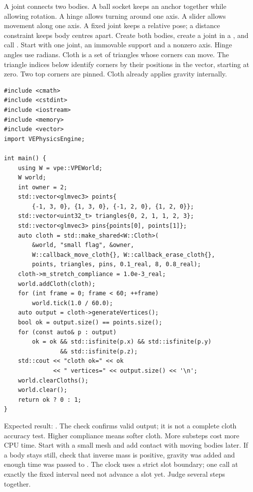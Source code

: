 \documentclass[11pt,a4paper]{article}
\begin{document}
A joint connects two bodies. A ball socket keeps an anchor together while allowing rotation. A hinge allows turning around one axis. A slider allows movement along one axis. A fixed joint keeps a relative pose; a distance constraint keeps body centres apart. Create both bodies, create a joint in a , and call . Start with one joint, an immovable support and a nonzero axis. Hinge angles use radians.
Cloth is a set of triangles whose corners can move. The triangle indices below identify corners by their positions in the vector, starting at zero. Two top corners are pinned. Cloth already applies gravity internally.%
\begin{lstlisting}
#include <cmath>
#include <cstdint>
#include <iostream>
#include <memory>
#include <vector>
import VEPhysicsEngine;

int main() {
    using W = vpe::VPEWorld;
    W world;
    int owner = 2;
    std::vector<glmvec3> points{
        {-1, 3, 0}, {1, 3, 0}, {-1, 2, 0}, {1, 2, 0}};
    std::vector<uint32_t> triangles{0, 2, 1, 1, 2, 3};
    std::vector<glmvec3> pins{points[0], points[1]};
    auto cloth = std::make_shared<W::Cloth>(
        &world, "small flag", &owner,
        W::callback_move_cloth{}, W::callback_erase_cloth{},
        points, triangles, pins, 0.1_real, 8, 0.8_real);
    cloth->m_stretch_compliance = 1.0e-3_real;
    world.addCloth(cloth);
    for (int frame = 0; frame < 60; ++frame)
        world.tick(1.0 / 60.0);
    auto output = cloth->generateVertices();
    bool ok = output.size() == points.size();
    for (const auto& p : output)
        ok = ok && std::isfinite(p.x) && std::isfinite(p.y)
                && std::isfinite(p.z);
    std::cout << "cloth ok=" << ok
              << " vertices=" << output.size() << '\n';
    world.clearCloths();
    world.clear();
    return ok ? 0 : 1;
}
\end{lstlisting}
Expected result: . The check confirms valid output; it is not a complete cloth accuracy test. Higher compliance means softer cloth. More substeps cost more CPU time. Start with a small mesh and add contact with moving bodies later.
If a body stays still, check that inverse mass is positive, gravity was added and enough time was passed to . The clock uses a strict slot boundary; one call at exactly the fixed interval need not advance a slot yet. Judge several steps together.
\end{document}
